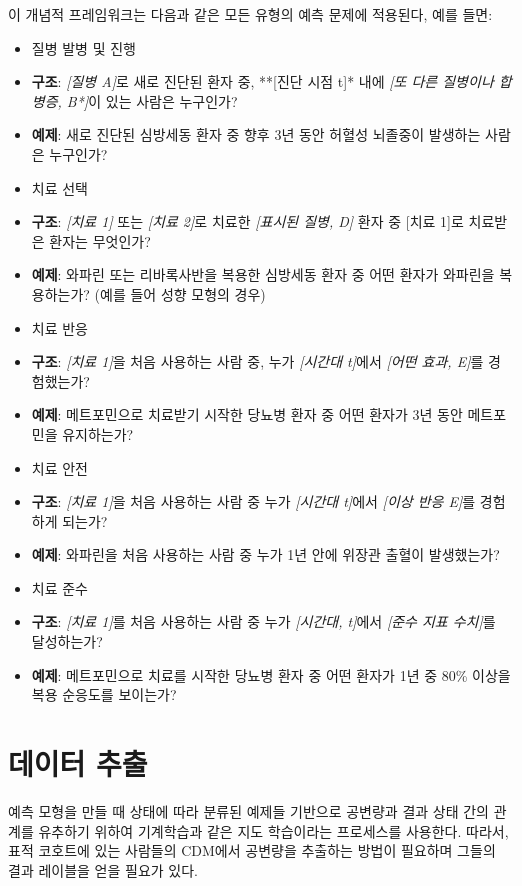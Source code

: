 \documentclass[11pt]{book}
\providecommand{\tightlist}{%
  \setlength{\itemsep}{0pt}\setlength{\parskip}{0pt}}
\theoremstyle{definition}
\theoremstyle{definition}
\theoremstyle{definition}
\theoremstyle{remark}
\begin{document}
이 개념적 프레임워크는 다음과 같은 모든 유형의 예측 문제에 적용된다,
예를 들면:

\begin{itemize}
\tightlist
\item
  질병 발병 및 진행
\item
  \textbf{구조}: \emph{{[}질병 A{]}}로 새로 진단된 환자 중, **{[}진단
  시점 t{]}* 내에 \emph{{[}또 다른 질병이나 합병증, B*{]}}이 있는 사람은
  누구인가?
\item
  \textbf{예제}: 새로 진단된 심방세동 환자 중 향후 3년 동안 허혈성
  뇌졸중이 발생하는 사람은 누구인가?
\item
  치료 선택
\item
  \textbf{구조}: \emph{{[}치료 1{]}} 또는 \emph{{[}치료 2{]}}로 치료한
  \emph{{[}표시된 질병, D{]}} 환자 중 {[}치료 1{]}로 치료받은 환자는
  무엇인가?
\item
  \textbf{예제}: 와파린 또는 리바록사반을 복용한 심방세동 환자 중 어떤
  환자가 와파린을 복용하는가? (예를 들어 성향 모형의 경우)
\item
  치료 반응
\item
  \textbf{구조}: \emph{{[}치료 1{]}}을 처음 사용하는 사람 중, 누가
  \emph{{[}시간대 t{]}}에서 \emph{{[}어떤 효과, E{]}}를 경험했는가?
\item
  \textbf{예제}: 메트포민으로 치료받기 시작한 당뇨병 환자 중 어떤 환자가
  3년 동안 메트포민을 유지하는가?
\item
  치료 안전
\item
  \textbf{구조}: \emph{{[}치료 1{]}}을 처음 사용하는 사람 중 누가
  \emph{{[}시간대 t{]}}에서 \emph{{[}이상 반응 E{]}}를 경험하게 되는가?
\item
  \textbf{예제}: 와파린을 처음 사용하는 사람 중 누가 1년 안에 위장관
  출혈이 발생했는가?
\item
  치료 준수
\item
  \textbf{구조}: \emph{{[}치료 1{]}}를 처음 사용하는 사람 중 누가
  \emph{{[}시간대, t{]}}에서 \emph{{[}준수 지표 수치{]}}를 달성하는가?
\item
  \textbf{예제}: 메트포민으로 치료를 시작한 당뇨병 환자 중 어떤 환자가
  1년 중 80\% 이상을 복용 순응도를 보이는가?
\end{itemize}

\section{데이터 추출}\label{--1}

예측 모형을 만들 때 상태에 따라 분류된 예제들 기반으로 공변량과 결과
상태 간의 관계를 유추하기 위하여 기계학습과 같은 지도 학습이라는
프로세스를 사용한다.  따라서, 표적 코호트에
있는 사람들의 CDM에서 공변량을 추출하는 방법이 필요하며 그들의 결과
레이블을 얻을 필요가 있다.
\end{document}
